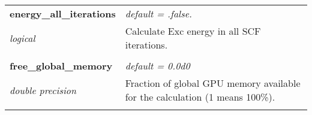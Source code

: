 \begin{Spacing}{1.0}
\begin{longtable}{ p{} p{} }
   \textbf{energy\_all\_iterations}
   &  \textit{default = .false. }
   \\*\textit{logical}
   & Calculate Exc energy in all SCF iterations.\\* \\

   \textbf{free\_global\_memory}
   &  \textit{default = 0.0d0}
   \\*\textit{double precision}
   & Fraction of global GPU memory available for the
   calculation (1 means 100\%).\\* \\

\end{longtable}
\end{Spacing}
